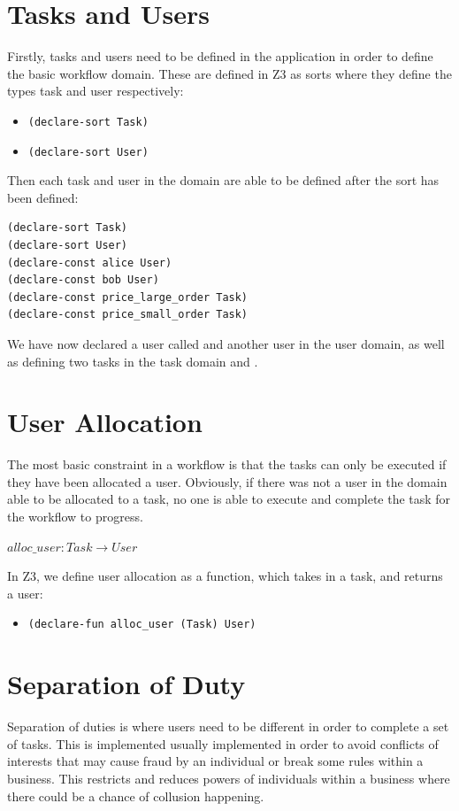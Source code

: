 \documentclass[a4paper]{report}
\begin{document}
\section{Tasks and Users}
Firstly, tasks and users need to be defined in the application in order to define the basic workflow domain. These are defined in Z3 as sorts where they define the types task and user respectively:
\begin{itemize}
\item \texttt{(declare-sort Task)}
\item \texttt{(declare-sort User)}
\end{itemize}

Then each task and user in the domain are able to be defined after the sort has been defined: \\
\lstset{numbers=left, showspaces=false,
    showstringspaces=false, tabsize=2, breaklines=true,
    xleftmargin=5.0ex,
}
\begin{lstlisting}[frame=single]
(declare-sort Task)
(declare-sort User)
(declare-const alice User)
(declare-const bob User)
(declare-const price_large_order Task)
(declare-const price_small_order Task)
\end{lstlisting}
We have now declared a user called  and another user  in the user domain, as well as defining two tasks in the task domain  and . 

\section{User Allocation}
The most basic constraint in a workflow is that the tasks can only be executed if they have been allocated a user. Obviously, if there was not a user in the domain able to be allocated to a task, no one is able to execute and complete the task for the workflow to progress.
\begin{center}
$alloc\_user : Task \rightarrow User$
\end{center}
In Z3, we define user allocation as a function, which takes in a task, and returns a user:
\begin{itemize}
\item \texttt{(declare-fun alloc\_user (Task) User)}
\end{itemize}

\section{Separation of Duty}
Separation of duties\cite{sod} is where users need to be different in order to complete a set of tasks. This is implemented usually implemented in order to avoid conflicts of interests that may cause fraud by an individual or break some rules within a business. This restricts and reduces powers of individuals within a business where there could be a chance of collusion happening. \\
\end{document}
